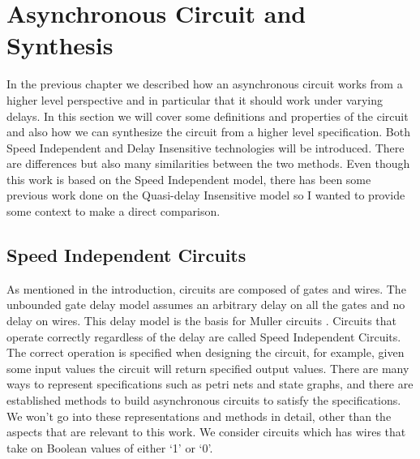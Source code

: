 \documentclass[12pt]{report}
\begin{document}
\section{Asynchronous Circuit and Synthesis}
In the previous chapter we described how an asynchronous circuit works from a higher level perspective and in particular that it should work under varying delays.  In this section we will cover some definitions and properties of the circuit and also how we can synthesize the circuit from a higher level specification.  Both Speed Independent and Delay Insensitive technologies will be introduced.  There are differences but also many similarities between the two methods.  Even though this work is based on the Speed Independent model, there has been some previous work done on the Quasi-delay Insensitive model so I wanted to provide some context to make a direct comparison.

\subsection{Speed Independent Circuits}
As mentioned in the introduction, circuits are composed of gates and wires.  The unbounded gate delay model assumes an arbitrary delay on all the gates and no delay on wires.  This delay model is the basis for Muller circuits \cite{Muller_59}.  Circuits that operate correctly regardless of the delay are called Speed Independent Circuits.  The correct operation is specified when designing the circuit, for example, given some input values the circuit will return specified output values.  
There are many ways to represent specifications such as petri nets and state graphs, and there are established methods to build asynchronous circuits to satisfy the specifications.  We won't go into these representations and methods in detail, other than the aspects that are relevant to this work.  We consider circuits which has wires that take on Boolean values of either `1' or `0'.\\
  
\end{document}

